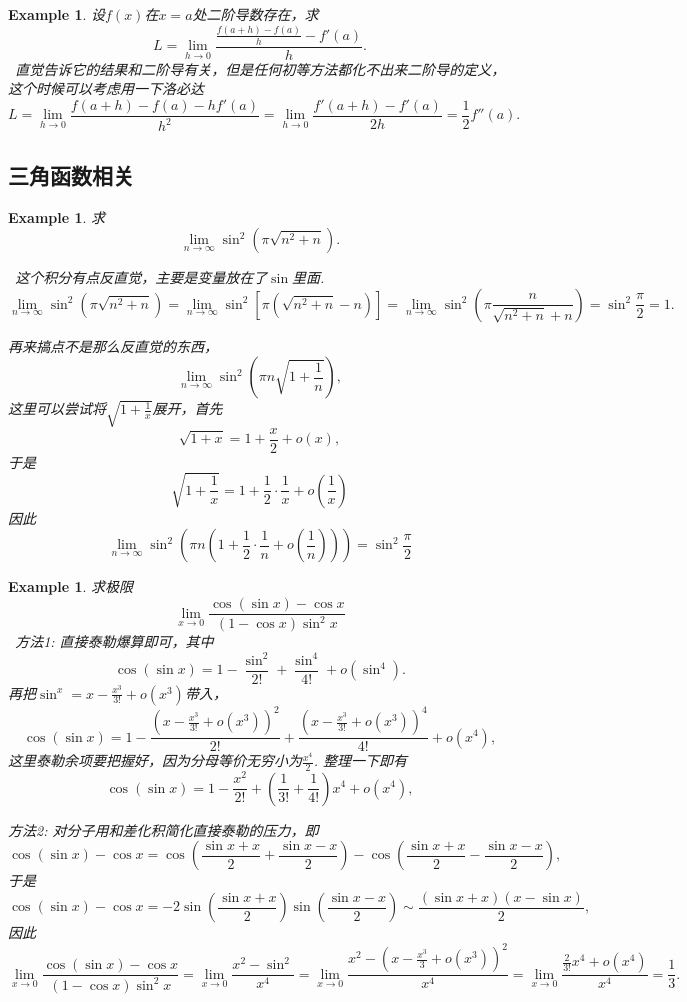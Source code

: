 \documentclass{article}
\newtheorem{example}[theorem]{Example}
\newcommand{\hints}{{\color{blue} \text{hints}}}
\begin{document}
\begin{example}
\rm 设$f(x)$在$x=a$处二阶导数存在，求
$$
L = \lim\limits_{h \to 0}\frac{\frac{f(a+h)-f(a)}{h}-f'(a)}{h}. 
$$
\hints\ 直觉告诉它的结果和二阶导有关，但是任何初等方法都化不出来二阶导的定义，这个时候可以考虑用一下洛必达
$$
L = \lim\limits_{h \to 0} \frac{f(a+h)-f(a)-hf'(a)}{h^2} = \lim\limits_{h \to 0} \frac{f'(a+h)-f'(a)}{2h} = \frac{1}{2}f''(a). 
$$
\end{example}

\subsection{三角函数相关}

\begin{example}
\rm 求
$$
\lim\limits_{n \to \infty} \sin^2(\pi \sqrt{n^2+n}). 
$$

\hints\ 这个积分有点反直觉，主要是变量放在了$\sin$里面. 
$$
\lim\limits_{n \to \infty} \sin^2(\pi \sqrt{n^2+n}) = \lim\limits_{n \to \infty} \sin^2[\pi(\sqrt{n^2 + n} -n)] = \lim\limits_{n \to \infty} \sin^2\left(\pi \frac{n}{\sqrt{n^2+n}+n} \right) = \sin^2 \frac{\pi}{2} = 1. 
$$

再来搞点不是那么反直觉的东西，
$$
\lim\limits_{n \to \infty} \sin^2 \left(\pi n \sqrt{1+\frac{1}{n}} \right),
$$
这里可以尝试将$\sqrt{1+\frac{1}{x}}$展开，首先
$$
\sqrt{1+x} = 1  + \frac{x}{2}+o(x),
$$
于是
$$
\sqrt{1+\frac{1}{x}} = 1 + \frac{1}{2}\cdot\frac{1}{x} + o(\frac{1}{x})
$$
因此
$$
\lim\limits_{n \to \infty} \sin^2 \left(\pi n (1 + \frac{1}{2}\cdot\frac{1}{n}+o(\frac{1}{n})) \right) = \sin^2\frac{\pi}{2}
$$
\end{example}

\begin{example}
\rm 求极限
$$
\lim\limits_{x \to 0} \frac{\cos(\sin x)-\cos x}{(1-\cos x)\sin^2 x}
$$
\hints\ 方法1: 直接泰勒爆算即可，其中
$$
\cos(\sin x) = 1 - \frac{\sin^2}{2!} + \frac{\sin^4}{4!} + o(\sin^4). 
$$
再把$\sin ^x = x -\frac{x^3}{3!} + o(x^3)$带入，
$$
\cos(\sin x) = 1 - \frac{(x -\frac{x^3}{3!} + o(x^3))^2}{2!} + \frac{(x -\frac{x^3}{3!} + o(x^3))^4}{4!} + o(x^4),
$$
这里泰勒余项要把握好，因为分母等价无穷小为$\frac{x^4}{2}$. 整理一下即有
$$
\cos(\sin x) = 1-\frac{x^2}{2!} + (\frac{1}{3!}+\frac{1}{4!})x^4 + o(x^4),
$$

方法2: 对分子用和差化积简化直接泰勒的压力，即
$$
\cos(\sin x)-\cos x = \cos\left( \frac{\sin x+x}{2} + \frac{\sin x-x}{2} \right) - \cos\left( \frac{\sin x+x}{2} - \frac{\sin x-x}{2} \right),
$$
于是
$$
\cos(\sin x)-\cos x  = -2\sin\left( \frac{\sin x+x}{2}  \right)\sin\left( \frac{\sin x-x}{2}\right) \sim \frac{(\sin x+x)(x-\sin x)}{2},
$$
因此
$$
\lim\limits_{x \to 0} \frac{\cos(\sin x)-\cos x}{(1-\cos x)\sin^2 x} = \lim\limits_{x \to 0} \frac{x^2 - \sin^2}{x^4} =  \lim\limits_{x \to 0} \frac{x^2-(x-\frac{x^3}{3}+o(x^3))^2}{x^4} = \lim\limits_{x \to 0} \frac{\frac{2}{3!}x^4 + o(x^4)}{x^4} = \frac{1}{3}.
$$
\end{example}
\end{document}
